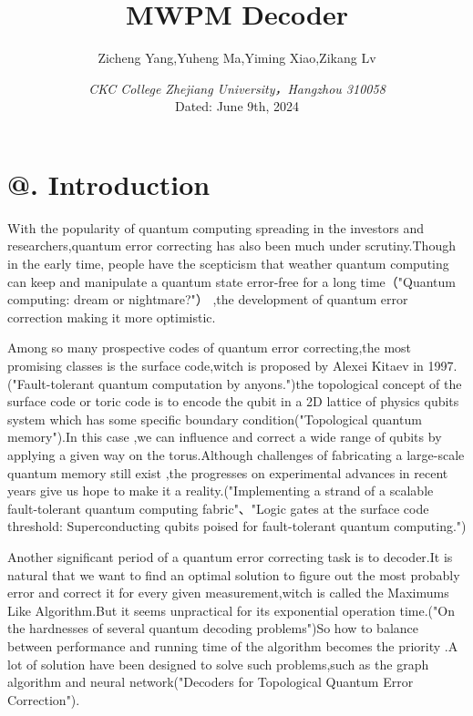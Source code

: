 \documentclass[
	a4paper, %
	10pt, %
	unnumberedsections, %
	twoside, %
]{LTJournalArticle}
\title{MWPM Decoder} %
\author{
	Zicheng Yang,Yuheng Ma,Yiming Xiao,Zikang Lv
}
\date{\footnotesize \textit{CKC College Zhejiang University，Hangzhou 310058} \\ Dated: June 9th, 2024}
\makeatletter
\newcommand{\Rmnum}[1]{\expandafter\@slowromancap\romannumeral #1@}
\makeatother
\begin{document}
\maketitle %


\section{\Rmnum{1}. Introduction}
With the popularity of quantum computing spreading in the investors and researchers,quantum error correcting has also been much under scrutiny.Though in the early time, people  have the scepticism that weather quantum computing can keep and manipulate a quantum state error-free for a long time（"Quantum computing: dream or nightmare?"） ,the development of quantum error correction making it more optimistic.

Among so many prospective codes of quantum error correcting,the most promising classes is the surface code,witch is proposed by Alexei Kitaev in 1997.("Fault-tolerant quantum computation by anyons.")the topological concept of the surface code or toric code is to encode the qubit in a 2D lattice of physics qubits system which has some specific boundary condition("Topological quantum memory").In this case ,we can influence and correct a wide range of qubits by applying a given way on the torus.Although challenges of fabricating a large-scale quantum memory still exist ,the progresses on experimental advances in recent years give us hope to make it a reality.("Implementing a strand of a scalable fault-tolerant quantum computing fabric"、"Logic gates at the surface code threshold: Superconducting qubits poised for fault-tolerant quantum computing.")

Another significant period of a quantum error correcting task is to decoder.It is natural that we want to find an optimal solution to figure out the most probably error and correct it for every given measurement,witch is called the Maximums Like Algorithm.But it seems unpractical for its exponential operation time.("On the hardnesses of several quantum decoding problems")So how to balance between performance and running time of the algorithm becomes the priority .A lot of solution have been designed to solve such problems,such as the graph algorithm and neural network("Decoders for Topological Quantum Error Correction").
\end{document}

